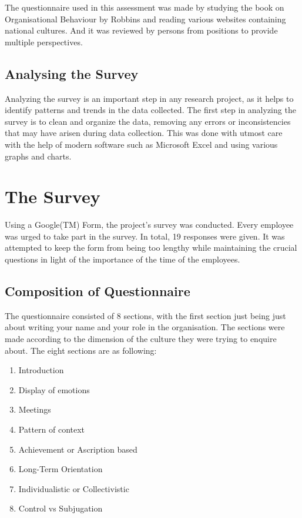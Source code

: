 \documentclass[12pt]{article}
\begin{document}
The questionnaire used in this assessment was made by studying the book on Organisational Behaviour by Robbins and reading various websites containing national cultures. And it was reviewed by persons from positions to provide multiple perspectives.

\subsection{Analysing the Survey}

Analyzing the survey is an important step in any research project, as it helps to identify patterns and trends in the data collected. The first step in analyzing the survey is to clean and organize the data, removing any errors or inconsistencies that may have arisen during data collection. This was done with utmost care with the help of modern software such as Microsoft Excel and using various graphs and charts.

\section{The Survey}

Using a Google(TM) Form, the project's survey was conducted. Every employee was urged to take part in the survey. In total, 19 responses were given. It was attempted to keep the form from being too lengthy while maintaining the crucial questions in light of the importance of the time of the employees.

\subsection*{Composition of Questionnaire}

The questionnaire consisted of 8 sections, with the first section just being just about writing your name and your role in the organisation. The sections were made according to the dimension of the culture they were trying to enquire about. The eight sections are as following:

\begin{enumerate}
    \item Introduction
    \item Display of emotions
    \item Meetings
    \item Pattern of context
    \item Achievement or Ascription based
    \item Long-Term Orientation
    \item Individualistic or Collectivistic
    \item Control vs Subjugation
\end{enumerate}
\end{document}
